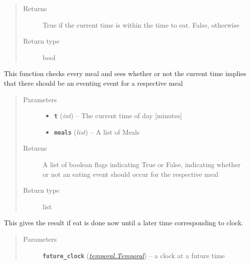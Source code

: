 \documentclass[letterpaper,10pt,english]{sphinxmanual}
\begin{document}
\begin{fulllineitems}
\begin{fulllineitems}
\begin{quote}
\begin{description}
\begin{itemize}
\end{itemize}

\item[{Returns}] \leavevmode
True if the current time is within the time to eat. False, otherwise

\item[{Return type}] \leavevmode
bool

\end{description}\end{quote}

\end{fulllineitems}


\begin{fulllineitems}
\label{hunger:hunger.Hunger.is_meal_time_all}
This function checks every meal and sees whether or not the current time         implies that there should be an eventing event for a respective meal
\begin{quote}\begin{description}
\item[{Parameters}] \leavevmode\begin{itemize}
\item {} 
\textbf{\texttt{t}} (\emph{int}) -- The current time of day {[}minutes{]}

\item {} 
\textbf{\texttt{meals}} (\emph{list}) -- A list of Meals

\end{itemize}

\item[{Returns}] \leavevmode
A list of boolean flags indicating True or False, indicating whether or not an         eating event should occur for the respective meal

\item[{Return type}] \leavevmode
list

\end{description}\end{quote}

\end{fulllineitems}


\begin{fulllineitems}
\label{hunger:hunger.Hunger.perceive}
This gives the result if eat is done now until a later time corresponding to clock.
\begin{quote}\begin{description}
\item[{Parameters}] \leavevmode
\textbf{\texttt{future\_clock}} ({\hyperref[temporal:temporal.Temporal]{\emph{\emph{temporal.Temporal}}}}) -- a clock at a future time


\end{description}
\end{quote}
\end{fulllineitems}
\end{fulllineitems}
\end{document}
